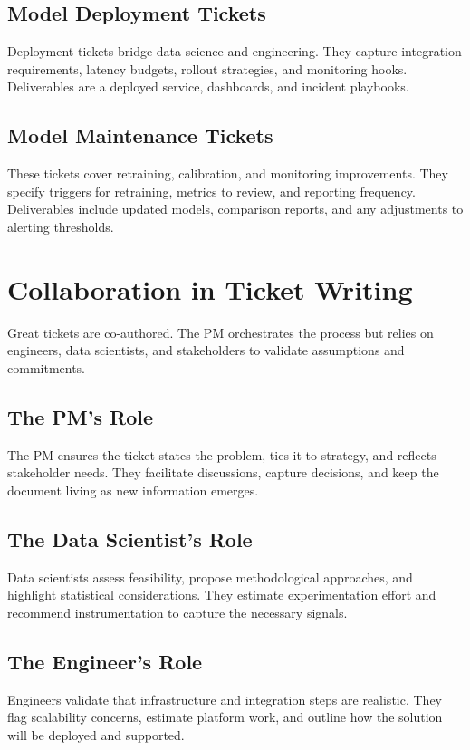 \subsection{Model Deployment Tickets}
Deployment tickets bridge data science and engineering. They capture integration requirements, latency budgets, rollout strategies, and monitoring hooks. Deliverables are a deployed service, dashboards, and incident playbooks.

\subsection{Model Maintenance Tickets}
These tickets cover retraining, calibration, and monitoring improvements. They specify triggers for retraining, metrics to review, and reporting frequency. Deliverables include updated models, comparison reports, and any adjustments to alerting thresholds.

\section{Collaboration in Ticket Writing}
\label{sec:ticket-collaboration}

Great tickets are co-authored. The PM orchestrates the process but relies on engineers, data scientists, and stakeholders to validate assumptions and commitments.

\subsection{The PM's Role}
The PM ensures the ticket states the problem, ties it to strategy, and reflects stakeholder needs. They facilitate discussions, capture decisions, and keep the document living as new information emerges.

\subsection{The Data Scientist's Role}
Data scientists assess feasibility, propose methodological approaches, and highlight statistical considerations. They estimate experimentation effort and recommend instrumentation to capture the necessary signals.

\subsection{The Engineer's Role}
Engineers validate that infrastructure and integration steps are realistic. They flag scalability concerns, estimate platform work, and outline how the solution will be deployed and supported.

